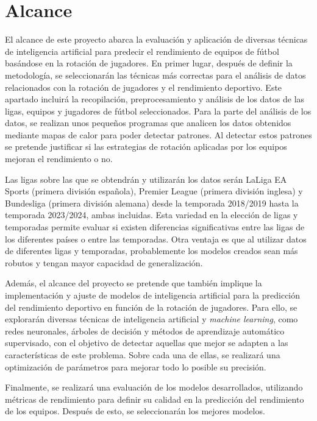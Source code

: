 \section{Alcance}
El alcance de este proyecto abarca la evaluación y aplicación de diversas técnicas de inteligencia artificial para predecir el rendimiento de equipos de fútbol basándose en la rotación de jugadores. En primer lugar, después de definir la metodología, se seleccionarán las técnicas más correctas para el análisis de datos relacionados con la rotación de jugadores y el rendimiento deportivo. Este apartado incluirá la recopilación, preprocesamiento y análisis de los datos de las ligas, equipos y jugadores de fútbol seleccionados. Para la parte del análisis de los datos, se realizan unos pequeños programas que analicen los datos obtenidos mediante mapas de calor para poder detectar patrones. Al detectar estos patrones se pretende justificar si las estrategias de rotación aplicadas por los equipos mejoran el rendimiento o no.

Las ligas sobre las que se obtendrán y utilizarán los datos serán LaLiga EA Sports (primera división española), Premier League (primera división inglesa) y Bundesliga (primera división alemana) desde la temporada 2018/2019 hasta la temporada 2023/2024, ambas incluidas. Esta
variedad en la elección de ligas y temporadas permite evaluar si existen diferencias significativas
entre las ligas de los diferentes países o entre las temporadas. Otra ventaja es que al utilizar datos de diferentes ligas y temporadas, probablemente los modelos creados sean más robutos y tengan mayor capacidad de generalización.

Además, el alcance del proyecto se pretende que también implique la implementación y ajuste de modelos de inteligencia artificial para la predicción del rendimiento deportivo en función de la rotación de jugadores. Para ello, se explorarán diversas técnicas de inteligencia artificial y \textit{machine learning}, como redes neuronales, árboles de decisión y métodos de aprendizaje automático supervisado, con el objetivo de detectar aquellas que mejor se adapten a las características de este problema. Sobre cada una de ellas, se realizará una optimización de parámetros para mejorar todo lo posible su precisión.

Finalmente, se realizará una evaluación de los modelos desarrollados, utilizando métricas de rendimiento para definir su calidad en la predicción del rendimiento de los equipos. Después de esto, se seleccionarán los mejores modelos.

